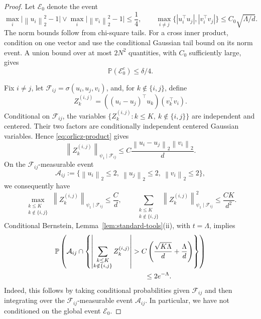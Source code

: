 \documentclass[11pt]{article}
\theoremstyle{remark}
\newcommand{\Pp}{\mathbb P}
\newcommand{\norm}[1]{\left\lVert #1\right\rVert}
\newcommand{\1}{\mathbf 1}
\newcommand{\psiOne}{\psi_1}
\begin{document}
\begin{proof}
Let $\mathcal E_0$ denote the event
\begin{equation}
 \max_i\bigl|\norm{u_i}_2^2-1\bigr|
 \vee\max_i\bigl|\norm{v_i}_2^2-1\bigr|\leq\frac14,
 \qquad
 \max_{i\neq j}\{|u_i^\top u_j|,|v_i^\top v_j|\}
 \leq C_0\sqrt{\Lambda/d}.
 \label{eq:endpoint-basic-event}
\end{equation}
The norm bounds follow from chi-square tails.  For a cross inner
product, condition on one vector and use the conditional Gaussian tail
bound on its norm event.  A union bound over at most $2N^2$
quantities, with $C_0$ sufficiently large, gives
\[
 \Pp(\mathcal E_0^c)\leq\delta/4.
\]

Fix $i\neq j$, let
$\mathcal F_{ij}=\sigma(u_i,u_j,v_i)$, and, for
$k\notin\{i,j\}$, define
\[
 Z_k^{(i,j)}
 =((u_i-u_j)^\top u_k)(v_k^\top v_i).
\]
Conditional on $\mathcal F_{ij}$, the variables
$\{Z_k^{(i,j)}:k\leq K,\ k\notin\{i,j\}\}$ are independent and
centered.  Their two factors are conditionally independent centered
Gaussian variables.  Hence \eqref{eq:orlicz-product} gives
\[
 \norm{Z_k^{(i,j)}}_{\psiOne\mid\mathcal F_{ij}}
 \leq C\frac{\norm{u_i-u_j}_2\norm{v_i}_2}{d}.
\]
On the $\mathcal F_{ij}$-measurable event
\[
 \mathcal A_{ij}
 :=\{\norm{u_i}_2\leq2,\ \norm{u_j}_2\leq2,\
       \norm{v_i}_2\leq2\},
\]
we consequently have
\[
 \max_{\substack{k\leq K\\k\notin\{i,j\}}}
 \norm{Z_k^{(i,j)}}_{\psiOne\mid\mathcal F_{ij}}
 \leq\frac Cd,
 \qquad
 \sum_{\substack{k\leq K\\k\notin\{i,j\}}}
 \norm{Z_k^{(i,j)}}_{\psiOne\mid\mathcal F_{ij}}^2
 \leq\frac{CK}{d^2}.
\]
Conditional Bernstein, Lemma~\ref{lem:standard-tools}(ii), with
$t=\Lambda$, implies
\begin{align*}
 &\Pp\left(
 \mathcal A_{ij}\cap
 \left\{
 \left|
 \sum_{\substack{k\leq K\\k\notin\{i,j\}}}Z_k^{(i,j)}
 \right|
 >
 C\left(\frac{\sqrt{K\Lambda}}d+\frac{\Lambda}{d}\right)
 \right\}\right)\\
 &\hspace{45mm}\leq2e^{-\Lambda}.
\end{align*}
Indeed, this follows by taking conditional probabilities given
$\mathcal F_{ij}$ and then integrating over the
$\mathcal F_{ij}$-measurable event $\mathcal A_{ij}$.  In particular,
we have not conditioned on the global event $\mathcal E_0$.


\end{proof}
\end{document}
